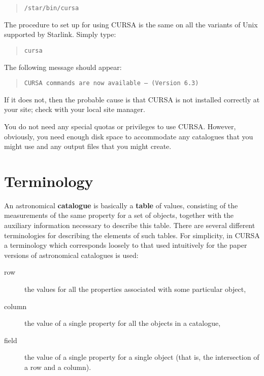 \documentclass[twoside,11pt]{article}
\newcommand{\xlabel}[1]{}
\renewcommand{\_}{\texttt{\symbol{95}}}
\begin{document}
\begin{verse}
{\tt /star/bin/cursa}
\end{verse}

The procedure to set up for using CURSA is the same on all the variants
of Unix supported by Starlink. Simply type:

\begin{verse}
{\tt cursa}
\end{verse}

The following message should appear:

\begin{verse}
{\tt CURSA commands are now available -- (Version 6.3)} \\
\end{verse}

If it does not, then the probable cause is that CURSA is not installed
correctly at your site; check with your local site manager.

You do not need any special quotas or privileges to use CURSA. However, 
obviously, you need enough disk space to accommodate any catalogues 
that you might use and any output files that you might create.


\section{\xlabel{COMP}\label{COMP}Terminology}

An astronomical {\bf catalogue} is basically a {\bf table} of values,
consisting of the measurements of the same property for a set of
objects, together with the auxiliary information necessary to describe 
this table. There are several different terminologies for describing 
the elements of such tables. For simplicity, in CURSA a terminology which 
corresponds loosely to that used intuitively for the paper versions of 
astronomical catalogues is used:

\begin{description}

  \item[row] the values for all the properties associated with some
   particular object,

  \item[column] the value of a single property for all the objects in
   a catalogue,

  \item[field] the value of a single property for a single object
   (that is, the intersection of a row and a column).

\end{description}
\end{document}
